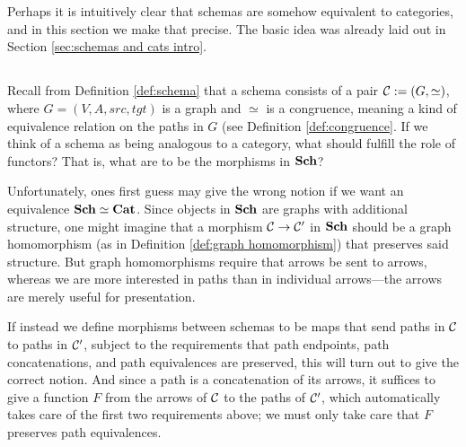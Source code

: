 \documentclass[CT4S-EN-RU]{subfiles}
\begin{document}
\section{}\label{sec:cat equiv sch}

Perhaps it is intuitively clear that schemas are somehow equivalent to categories, and in this section we make that precise. The basic idea was already laid out in Section \ref{sec:schemas and cats intro}.


\subsection{}\label{sec:sch as category}

Recall from Definition \ref{def:schema} that a schema consists of a pair $\mathcal{C}:=(G,\simeq)$, where $G=(V,A,src,tgt)$ is a graph and $\simeq$ is a congruence, meaning a kind of equivalence relation on the paths in $G$ (see Definition \ref{def:congruence}. If we think of a schema as being analogous to a category, what should fulfill the role of functors? That is, what are to be the morphisms in ${\bf Sch}$?

Unfortunately, ones first guess may give the wrong notion if we want an equivalence ${\bf Sch}\simeq{\bf Cat}$. Since objects in ${\bf Sch}$ are graphs with additional structure, one might imagine that a morphism $\mathcal{C}\rightarrow\mathcal{C}'$ in ${\bf Sch}$ should be a graph homomorphism (as in Definition \ref{def:graph homomorphism}) that preserves said structure. But graph homomorphisms require that arrows be sent to arrows, whereas we are more interested in paths than in individual arrows—the arrows are merely useful for presentation. 

If instead we define morphisms between schemas to be maps that send paths in $\mathcal{C}$ to paths in $\mathcal{C}'$, subject to the requirements that path endpoints, path concatenations, and path equivalences are preserved, this will turn out to give the correct notion. And since a path is a concatenation of its arrows, it suffices to give a function $F$ from the arrows of $\mathcal{C}$ to the paths of $\mathcal{C}'$, which automatically takes care of the first two requirements above; we must only take care that $F$ preserves path equivalences.
\end{document}
